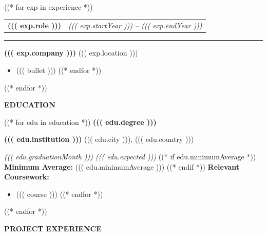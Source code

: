 \documentclass[11pt, a4paper]{article}
\newcommand{\cvsection}[1]{%
  \vspace{6pt}%
  \noindent%
  \colorbox{DKGreen}{\hspace{4pt}\rule{0pt}{14pt}\hspace{4pt}}%
  \colorbox{CardBG}{%
    \parbox[c][14pt]{\dimexpr\linewidth-16pt\relax}{%
      \hspace{8pt}\textcolor{DKGreen}{\textbf{\large\MakeUppercase{#1}}}%
    }%
  }%
  \par
  \noindent{\color{BorderClr}\rule{\linewidth}{0.6pt}}%
  \vspace{4pt}\par\noindent%
}
\newcommand{\sectionrule}{%
  \vspace{2pt}{\color{BorderClr}\rule{\linewidth}{0.6pt}}\vspace{4pt}%
}
\begin{document}
((* for exp in experience *))
\vspace{6pt}
\noindent
\begin{tabularx}{\linewidth}{Xr}
  \textcolor{DarkTxt}{\textbf{\large ((( exp.role )))}} &
  \textcolor{LiteTxt}{\textit{((( exp.startYear ))) -- ((( exp.endYear )))}} \\
\end{tabularx}%
{\color{DKGreen}\rule{\linewidth}{0.8pt}}%
\vspace{2pt}
\noindent\textcolor{MDGreen}{\textbf{((( exp.company )))}}\;%
\textcolor{LiteTxt}{\bullet\; ((( exp.location )))}
\vspace{3pt}
\begin{itemize}
((* for bullet in exp.bullets *))
  \item\textcolor{MidTxt}{((( bullet )))}
((* endfor *))
\end{itemize}
\vspace{2pt}
((* endfor *))

\newpage

\cvsection{Education}

((* for edu in education *))
\vspace{6pt}
\noindent\textcolor{DarkTxt}{\textbf{\large ((( edu.degree )))}}\par
\vspace{2pt}
\noindent\textcolor{MDGreen}{\textbf{((( edu.institution )))}}\;%
\textcolor{LiteTxt}{\bullet\; ((( edu.city ))), ((( edu.country )))}\par
\vspace{1pt}
\noindent\textcolor{LiteTxt}{\textit{((( edu.graduationMonth ))) ((( edu.expected )))}}
\vspace{2pt}
((* if edu.minimumAverage *))
\noindent\textcolor{MidTxt}{\textbf{Minimum Average:}}\;%
\textcolor{DKGreen}{((( edu.minimumAverage )))}
\vspace{3pt}
((* endif *))
\noindent\textcolor{DKGreen}{\textbf{Relevant Coursework:}}
\sectionrule
\begin{itemize}
((* for course in edu.coursework *))
  \item \textcolor{MidTxt}{((( course )))}
((* endfor *))
\end{itemize}
\vspace{2pt}
((* endfor *))

\newpage

\cvsection{Project Experience}
\end{document}
